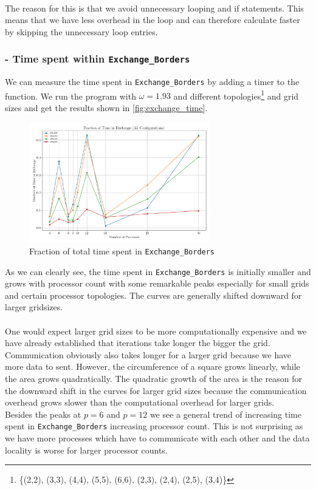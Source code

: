 \\
The reason for this is that we avoid unnecessary looping and if statements. This means that we have less overhead in the loop and can therefore calculate faster by skipping the unnecessary loop entries. 

\subsubsection{ - Time spent within \texttt{Exchange\_Borders}}
We can measure the time spent in \texttt{Exchange\_Borders} by adding a timer to the function. We run the program with $\omega = 1.93$ and different topologies\footnote{\{(2,2), (3,3), (4,4), (5,5), (6,6), (2,3), (2,4), (2,5), (3,4)\}} and grid sizes and get the results shown in \autoref{fig:exchange_time}.
\begin{figure}[H]
    \centering
    \includegraphics[width=0.7\textwidth]{../fig/lab1/fraction_exchange_comparison_connected.png}
    \caption{Fraction of total time spent in \texttt{Exchange\_Borders}}
    \label{fig:exchange_time}
\end{figure}
As we can clearly see, the time spent in \texttt{Exchange\_Borders} is initially smaller and grows with processor count with some remarkable peaks especially for small grids and certain processor topologies. The curves are generally shifted downward for larger gridsizes. \\

\\
One would expect larger grid sizes to be more computationally expensive and we have already established that iterations take longer the bigger the grid. Communication obviously also takes longer for a larger grid because we have more data to sent. However, the circumference of a square grows linearly, while the area grows quadratically. The quadratic growth of the area is the reason for the downward shift in the curves for larger grid sizes because the communication overhead grows slower than the computational overhead for larger grids.\\
Besides the peaks at $p=6$ and $p=12$ we see a general trend of increasing time spent in \texttt{Exchange\_Borders} increasing processor count. This is not surprising as we have more processes which have to communicate with each other and the data locality is worse for larger processor counts.

